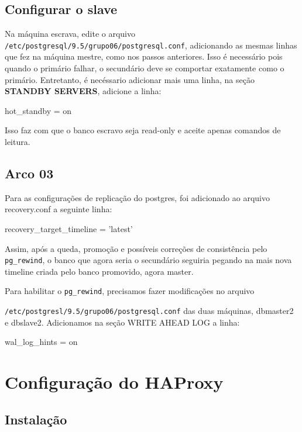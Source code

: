 \documentclass[a4paper,10pt]{article}
\begin{document}
    \subsection{Configurar o slave}
        Na máquina escrava, edite o arquivo \verb|/etc/postgresql/9.5/grupo06/postgresql.conf|, adicionando as mesmas linhas que fez na máquina mestre, como nos passos anteriores. Isso é necessário pois quando o primário falhar, o secundário deve se comportar exatamente como o primário. Entretanto, é necéssario adicionar mais uma linha, na seção \textbf{STANDBY SERVERS}, adicione a linha:
        \begin{spverbatim}
        hot_standby = on
        \end{spverbatim}

        Isso faz com que o banco escravo seja read-only e aceite apenas comandos de leitura.
        
    \subsection{Arco 03}
    
        Para as configurações de replicação do postgres, foi adicionado ao arquivo recovery.conf a seguinte linha:
        \begin{spverbatim}
        recovery_target_timeline = 'latest'
        \end{spverbatim}
    
        Assim, após a queda, promoção e possíveis correções de consistência pelo \verb|pg_rewind|, o banco que agora seria o secundário seguiria pegando na mais nova timeline criada pelo banco promovido, agora master.
    
    
    Para habilitar o \verb|pg_rewind|, precisamos fazer modificações no arquivo
    
    \verb|/etc/postgresl/9.5/grupo06/postgresql.conf| das duas máquinas, dbmaster2 e dbslave2. Adicionamos na seção WRITE AHEAD LOG a linha:
        
        \begin{spverbatim}
        wal_log_hints = on
        \end{spverbatim}

\section{Configuração do HAProxy}

    \subsection{Instalação}
\end{document}
